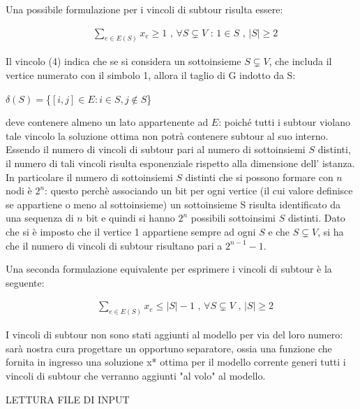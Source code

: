 \documentclass[11pt]{article}
\begin{document}
\vspace{2\baselineskip}

Una possibile formulazione per i vincoli di subtour risulta essere:

\begin{eqnarray}
&\displaystyle{\sum_{e \in E(S)}x_e \geq 1} \text{ , } \forall S \subsetneq V \text{ : } 1 \in S \text{ , } |S| \geq 2
\end{eqnarray}


Il vincolo (4) indica che se si considera un sottoinsieme $S \subsetneq V$, che includa il vertice numerato con il simbolo 1, allora il taglio di G indotto da S:

\begin{center}
$\delta(S) = $\{$ {[i,j]\in E : i \in S, j \notin S} $\} $ $
\end{center}

deve contenere almeno un lato appartenente ad $E$: poich\'e tutti i subtour violano tale vincolo la soluzione ottima non potr\`a contenere subtour al suo interno.  
Essendo il numero di vincoli di subtour pari al numero di sottoinsiemi $S$ distinti, il numero di tali vincoli risulta esponenziale rispetto alla dimensione dell' istanza. In particolare il numero di sottoinsiemi $S$ distinti che si possono formare con $n$ nodi \`e $2^n$: questo perch\`e associando un bit per ogni vertice (il cui valore definisce se appartiene o meno al sottoinsieme) un sottoinsieme S risulta identificato da una sequenza di $n$ bit e quindi si hanno $2^n$ possibili sottoinsimi $S$ distinti. Dato che si \`e imposto che il vertice 1 appartiene sempre ad ogni $S$ e che $S \subsetneq V$, si ha che il numero di vincoli di subtour risultano pari a  $2^{n-1} - 1$.

Una seconda formulazione equivalente per esprimere i vincoli di subtour \`e la seguente:

\begin{eqnarray}
&\displaystyle{\sum_{e \in E(S)}x_e \leq |S| - 1} \text{ , } \forall S \subsetneq V \text{ , } |S| \geq 2
\end{eqnarray}

I vincoli di subtour non sono stati aggiunti al modello per via del loro numero: sar\`a nostra cura progettare un opportuno separatore, ossia una funzione che fornita in ingresso una soluzione x* ottima per il modello corrente generi tutti i vincoli di subtour che verranno aggiunti "al volo" al modello.


\vspace{2\baselineskip}
LETTURA FILE DI INPUT
\vspace{2\baselineskip}
\end{document}
